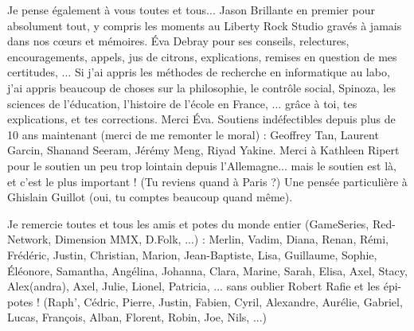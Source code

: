 \begin{small}


\smallskip

Je pense également à vous toutes et tous... Jason Brillante en premier pour absolument tout, y compris les moments au Liberty Rock Studio gravés à jamais dans nos c\oe{}urs et mémoires.
Éva Debray pour ses conseils, relectures, encouragements, appels, jus de citrons, explications, remises en question de mes certitudes, ...
Si j'ai appris les méthodes de recherche en informatique au labo, j'ai appris beaucoup de choses sur la philosophie, le contrôle social, Spinoza, les sciences de l'éducation, l'histoire de l'école en France, ... grâce à toi, tes explications, et tes corrections.
Merci Éva.
Soutiens indéfectibles depuis plus de 10 ans maintenant (merci de me remonter le moral) : Geoffrey Tan, Laurent Garcin, Shanand Seeram, Jérémy Meng, Riyad Yakine.
Merci à Kathleen Ripert pour le soutien un peu trop lointain depuis l'Allemagne... mais le soutien est là, et c'est le plus important ! (Tu reviens quand à Paris ?)
Une pensée particulière à Ghislain Guillot (oui, tu comptes beaucoup quand même).

\smallskip

Je remercie toutes et tous les amis et potes du monde entier (GameSeries, Red-Network, Dimension MMX, D.Folk, ...) : Merlin, Vadim, Diana, Renan, Rémi, Frédéric, Justin, Christian, Marion, Jean-Baptiste, Lisa, Guillaume, Sophie, Éléonore, Samantha, Angélina, Johanna, Clara, Marine, Sarah, Elisa, Axel, Stacy, Alex(andra), Axel, Julie, Lionel, Patricia, ... sans oublier Robert Rafie et les épi-potes ! (Raph', Cédric, Pierre, Justin, Fabien, Cyril, Alexandre, Aurélie, Gabriel, Lucas, François, Alban, Florent, Robin, Joe, Nils, ...)


\end{small}
